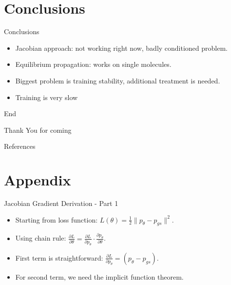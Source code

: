 \documentclass{beamer}
\begin{document}
\section{Conclusions}
\begin{frame}{Conclusions}
  \begin{itemize}
    \item Jacobian approach: not working right now, badly conditioned problem.
    \item Equilibrium propagation: works on single molecules.
    \item Biggest problem is training stability, additional treatment is needed.
    \item Training is very slow

  \end{itemize}
\end{frame}

\begin{frame}{End}
\begin{center}
 Thank You for coming
\end{center}
\end{frame}
\begin{frame}[allowframebreaks]{References}
\nocite{*}


\end{frame}

\appendix
\section{Appendix}
\begin{frame}{Jacobian Gradient Derivation - Part 1}
  \begin{itemize}
    \item Starting from loss function: $L(\theta) = \frac{1}{2}\|p_{\theta} - p_{gs}\|^2$.
    \item Using chain rule: $\frac{\partial L}{\partial \theta} = \frac{\partial L}{\partial p_{\theta}} \cdot \frac{\partial p_{\theta}}{\partial \theta}$.
    \item First term is straightforward: $\frac{\partial L}{\partial p_{\theta}} = (p_{\theta} - p_{gs})$.
    \item For second term, we need the implicit function theorem.
  \end{itemize}
\end{frame}
\end{document}

